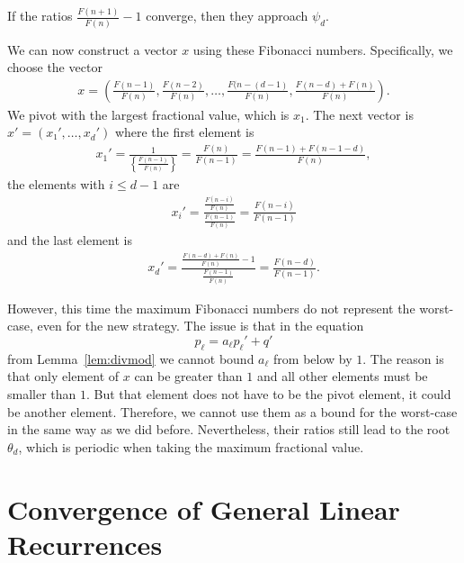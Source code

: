 \begin{corollary}
  If the ratios $\frac{F(n+1)}{F(n)} - 1$ converge, then they approach $ψ_d$.
\end{corollary}

We can now construct a vector $x$ using these Fibonacci numbers.
Specifically, we choose the vector
\begin{align*}
  x = \left(
    \frac{F(n-1)}{F(n)},
    \frac{F(n-2)}{F(n)},
    …,
    \frac{F(n-(d-1)}{F(n)},
    \frac{F(n-d) + F(n)}{F(n)} \right).
\end{align*}
We pivot with the largest fractional value, which is $x_1$.
The next vector is $x' = (x₁', …, x_d')$ where
the first element is
\begin{align*}
  x_1'
  = \frac{1}{\left\{\frac{F(n-1)}{F(n)}\right\}}
  = \frac{F(n)}{F(n-1)}
  = \frac{F(n-1) + F(n-1-d)}{F(n)},
\end{align*}
the elements with $i ≤ d - 1$ are
\begin{align*}
  x_i'
  = \frac{\frac{F(n-i)}{F(n)}}{\frac{F(n-1)}{F(n)}}
  = \frac{F(n-i)}{F(n-1)}
\end{align*}
and the last element is
\begin{align*}
  x_d'
  = \frac{\frac{F(n-d) + F(n)}{F(n)} - 1}{\frac{F(n-1)}{F(n)}}
  = \frac{F(n-d)}{F(n-1)}.
\end{align*}

However, this time the maximum Fibonacci numbers do not represent the worst-case,
even for the new strategy.
The issue is that in the equation
\[
  p_ℓ = a_ℓ p_ℓ' + q'
\]
from Lemma~\ref{lem:divmod} we cannot bound $a_ℓ$ from below by $1$.
The reason is that only element of $x$ can be greater than $1$
and all other elements must be smaller than $1$.
But that element does not have to be the pivot element,
it could be another element.
Therefore, we cannot use them as a bound for the worst-case
in the same way as we did before.
Nevertheless, their ratios still lead to the root $θ_d$,
which is periodic when taking the maximum fractional value.

\section{Convergence of General Linear Recurrences}
\label{sec:fib-conv}


